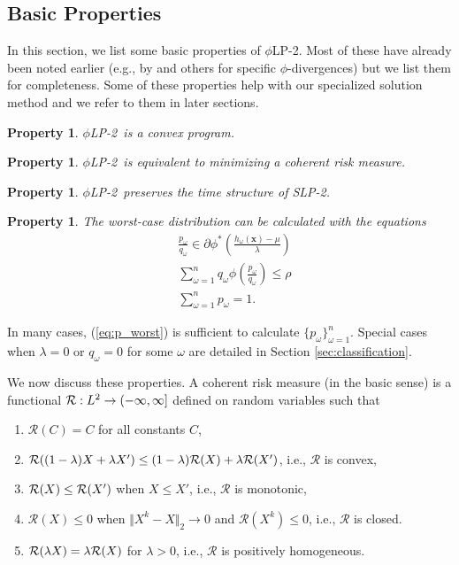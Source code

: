 \documentclass[ijoc,letterpaper]{informs3} %
\newcommand{\x}{\mathbf{x}}
\newtheorem{property}[theorem]{Property}
\newcommand{\plp}{$\phi$LP-2}
\begin{document}
\subsection{Basic Properties}
\label{ssec:basicprop}

In this section, we list some basic properties of \plp.
Most of these have already been noted earlier (e.g., by \cite{bental2011robust} and others for specific $\phi$-divergences) but we list them for completeness. Some of these properties help with our specialized solution method and we refer to them in later sections.

\begin{property}\label{property1}
	\plp\ is a convex program.
\end{property}

\begin{property}\label{property2}
	\label{prop:coherent_risk_measure}
	\plp\ is equivalent to minimizing a coherent risk measure.
\end{property}

\begin{property}\label{property3}
	\plp\ preserves the time structure of SLP-2.
\end{property}

\begin{property}\label{property4}
	The worst-case distribution can be calculated with the equations
	\begin{align} 
		& \frac{p_\omega}{q_\omega} \in \partial \phi^*\left(\frac{h_\omega(\x)-\mu}{\lambda}\right) \label{eq:p_worst} \\
		& \sum_{\omega=1}^n q_\omega \phi\left(\frac{p_\omega}{q_\omega}\right) \leq \rho \nonumber \\
		& \sum_{\omega=1}^n p_\omega = 1. \nonumber
	\end{align}
\end{property}
In many cases, (\ref{eq:p_worst}) is sufficient to calculate $\{p_\omega\}_{\omega=1}^n$.
Special cases when $\lambda = 0$ or $q_\omega = 0$ for some $\omega$ are detailed in Section \ref{sec:classification}.


We now discuss these properties. A coherent risk measure (in the basic sense) is a functional ${\cal R}: L^2 \rightarrow (-\infty,\infty]$ defined on random variables such that \citep{rockafellar2007coherent}
\begin{enumerate}
	\item $\mathcal{R}(C) = C$ for all constants $C$,
	\item $\mathcal{R}((1-\lambda)X + \lambda X') \leq (1-\lambda){\cal R}(X) + \lambda {\cal R}(X')$, i.e., $\mathcal{R}$ is convex,
	\item $\mathcal{R}(X) \leq {\cal R}(X')$ when $X \leq X'$, i.e., $\mathcal{R}$ is monotonic,
	\item $\mathcal{R}(X) \leq 0$ when $\Vert X^k - X \Vert_2 \rightarrow 0$ and $\mathcal{R}(X^k) \leq 0$, i.e., $\mathcal{R}$ is closed.
	\item $\mathcal{R}(\lambda X) = \lambda {\cal R}(X)$ for $\lambda > 0$, i.e., $\mathcal{R}$ is positively homogeneous.
\end{enumerate}
\end{document}
